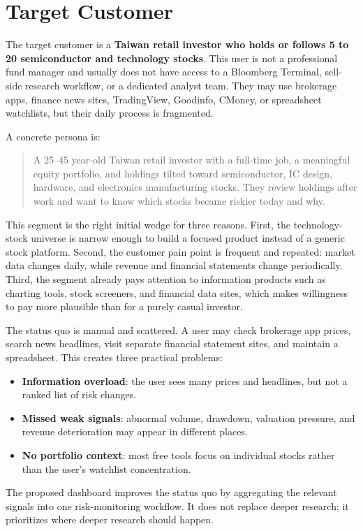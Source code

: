 \section{Target Customer}
\label{sec:target-customer}

The target customer is a \textbf{Taiwan retail investor who holds or follows 5 to 20 semiconductor and technology stocks}. This user is not a professional fund manager and usually does not have access to a Bloomberg Terminal, sell-side research workflow, or a dedicated analyst team. They may use brokerage apps, finance news sites, TradingView, Goodinfo, CMoney, or spreadsheet watchlists, but their daily process is fragmented.

A concrete persona is:

\begin{quote}
    A 25--45 year-old Taiwan retail investor with a full-time job, a meaningful equity portfolio, and holdings tilted toward semiconductor, IC design, hardware, and electronics manufacturing stocks. They review holdings after work and want to know which stocks became riskier today and why.
\end{quote}

This segment is the right initial wedge for three reasons. First, the technology-stock universe is narrow enough to build a focused product instead of a generic stock platform. Second, the customer pain point is frequent and repeated: market data changes daily, while revenue and financial statements change periodically. Third, the segment already pays attention to information products such as charting tools, stock screeners, and financial data sites, which makes willingness to pay more plausible than for a purely casual investor.

The status quo is manual and scattered. A user may check brokerage app prices, search news headlines, visit separate financial statement sites, and maintain a spreadsheet. This creates three practical problems:

\begin{itemize}
    \item \textbf{Information overload}: the user sees many prices and headlines, but not a ranked list of risk changes.
    \item \textbf{Missed weak signals}: abnormal volume, drawdown, valuation pressure, and revenue deterioration may appear in different places.
    \item \textbf{No portfolio context}: most free tools focus on individual stocks rather than the user's watchlist concentration.
\end{itemize}

The proposed dashboard improves the status quo by aggregating the relevant signals into one risk-monitoring workflow. It does not replace deeper research; it prioritizes where deeper research should happen.
